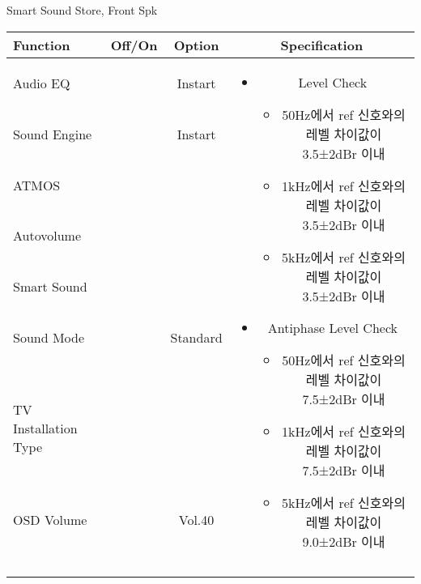 \begin{frame}[t]{Smart Sound Store, Front Spk}
\begin{tiny}
\begin{tabular}{@{}lccc@{}}
\toprule
Function & Off/On & Option & Specification \\
\midrule
Audio EQ & \color{black}{Off} & Instart &
\multirow{10}{60mm}{
\begin{itemize}
	\item Level Check
	\begin{itemize}
		\item 50Hz에서 ref 신호와의 레벨 차이값이 3.5±2dBr 이내
		\item 1kHz에서 ref 신호와의 레벨 차이값이 3.5±2dBr 이내
		\item 5kHz에서 ref 신호와의 레벨 차이값이 3.5±2dBr 이내
	\end{itemize}
	\item Antiphase Level Check
	\begin{itemize}
		\item 50Hz에서 ref 신호와의 레벨 차이값이 7.5±2dBr 이내
		\item 1kHz에서 ref 신호와의 레벨 차이값이 7.5±2dBr 이내
		\item 5kHz에서 ref 신호와의 레벨 차이값이 9.0±2dBr 이내
	\end{itemize}
\end{itemize}
} \\
Sound Engine & \color{blue}{On} & Instart & \\
ATMOS & \color{black}{Off}  & & \\
Autovolume & \color{black}{Off} & & \\
Smart Sound & \color{blue}{On} & & \\
Sound Mode & \color{blue}{On} & Standard & \\
TV Installation Type & \color{blue}{On} & \color{black}{Standtype1} & \\
OSD Volume & \color{blue}{On} & Vol.40 & \\
& & & \\
& & & \\
& & & \\
& & & \\
\midrule
\end{tabular}
\end{tiny}

\end{frame}


